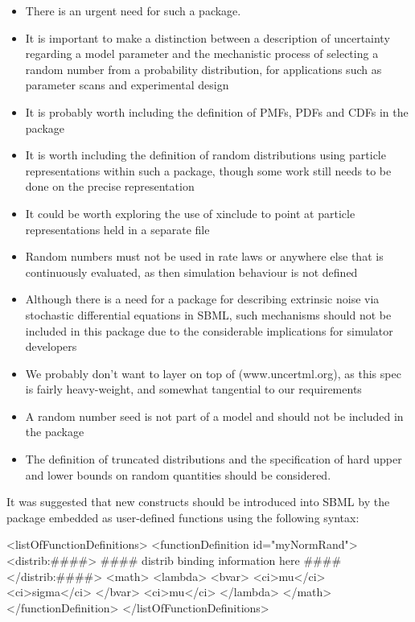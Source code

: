 \documentclass[draftspec]{sbmlpkgspec}
\begin{document}
\begin{itemize}
\item There is an urgent need for such a package.
\item It is important to make a distinction between a description of
  uncertainty regarding a model parameter and the mechanistic process
  of selecting a random number from a probability distribution, for
  applications such as parameter scans and experimental design
\item It is probably worth including the definition of PMFs, PDFs and CDFs in the package
\item It is worth including the definition of random distributions using particle representations within such a package, though some work
 still needs to be done on the precise representation
\item It could be worth exploring the use of xinclude to point at particle
representations held in a separate file
\item Random numbers must not be used in rate laws or anywhere else that
 is continuously evaluated, as then simulation behaviour is not
 defined
\item Although there is a need for a package for describing extrinsic
 noise via stochastic differential equations in SBML, such mechanisms
 should not be included in this package due to the considerable
 implications for simulator developers
\item We probably don't want to layer on top of \uncertml
 (www.uncertml.org), as this spec is fairly heavy-weight, and
 somewhat tangential to our requirements
\item A random number seed is not part of a model and should not be
 included in the package
\item The definition of truncated distributions and the specification of
 hard upper and lower bounds on random quantities should be
 considered.
\end{itemize}

It was suggested that new constructs should be introduced into SBML by
the package embedded as user-defined functions using the following
syntax:

\begin{example}
<listOfFunctionDefinitions>
  <functionDefinition id="myNormRand">
    <distrib:####>
      #### distrib binding information here ####
    </distrib:####>
    <math>
      <lambda>
        <bvar>
          <ci>mu</ci>
          <ci>sigma</ci>
        </bvar>
        <ci>mu</ci>
      </lambda>
    </math>
  </functionDefinition>
</listOfFunctionDefinitions>
\end{example}
\end{document}
